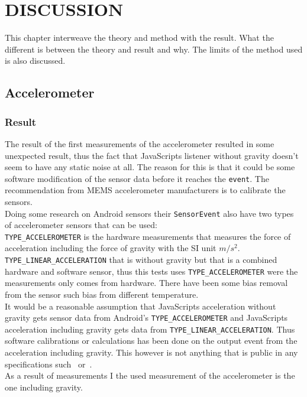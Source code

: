 \chapter{DISCUSSION}\label{cha:discussion}
This chapter interweave the theory and method with the result. What the different is between the theory and result and why. The limits of the method used is also discussed.

\section{Accelerometer}
\subsection{Result}
The result of the first measurements of the accelerometer resulted in some unexpected result, thus the fact that JavaScripts listener without gravity doesn't seem to have any static noise at all. The reason for this is that it could be some software modification of the sensor data before it reaches the \texttt{event}. The recommendation from MEMS accelerometer manufacturers is to calibrate the sensors.~\cite[]{acc:kionixerr}\\ 
Doing some research on Android sensors their \texttt{SensorEvent} also have two types of accelerometer sensors that can be used: \\
\texttt{TYPE\_ACCELEROMETER} is the hardware measurements that measures the force of acceleration including the force of gravity with the SI unit $m/s^2$. \\
\texttt{TYPE\_LINEAR\_ACCELERATION} that is without gravity but that is a combined hardware and software sensor, thus this tests uses \texttt{TYPE\_ACCELEROMETER} were the measurements only comes from hardware. There have been some bias removal from the sensor such bias from different temperature. \cite[]{android:sensorEvent}\\
It would be a reasonable assumption that JavaScripts acceleration without gravity gets sensor data from Android's \texttt{TYPE\_ACCELEROMETER} and JavaScripts acceleration including gravity gets data from \texttt{TYPE\_LINEAR\_ACCELERATION}. Thus software calibrations or calculations has been done on the output event from the acceleration including gravity. This however is not anything that is public in any specifications such~\cite[]{sensor:W3Cspec} or~\cite[]{sensor:accIncludingGravity}.\\ 
As a result of measurements I the used measurement of the accelerometer is the one including gravity. \\
